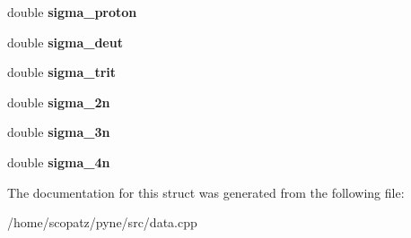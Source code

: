 \begin{DoxyCompactItemize}
\item 
\hypertarget{structsimple__xs_aff5767a5644512bc20acdb7b6be11f6a}{double {\bfseries sigma\-\_\-proton}}\label{structsimple__xs_aff5767a5644512bc20acdb7b6be11f6a}

\item 
\hypertarget{structsimple__xs_a144a201fa75999fe72b1e7ff6cf599de}{double {\bfseries sigma\-\_\-deut}}\label{structsimple__xs_a144a201fa75999fe72b1e7ff6cf599de}

\item 
\hypertarget{structsimple__xs_ac94cd1b3c4d07c830484563268c9e3b4}{double {\bfseries sigma\-\_\-trit}}\label{structsimple__xs_ac94cd1b3c4d07c830484563268c9e3b4}

\item 
\hypertarget{structsimple__xs_a48428459c08bd8e7ca73ede3d5d1b12d}{double {\bfseries sigma\-\_\-2n}}\label{structsimple__xs_a48428459c08bd8e7ca73ede3d5d1b12d}

\item 
\hypertarget{structsimple__xs_a2d20b02fe8098c55466d12de065bfdee}{double {\bfseries sigma\-\_\-3n}}\label{structsimple__xs_a2d20b02fe8098c55466d12de065bfdee}

\item 
\hypertarget{structsimple__xs_a1c2a32a82a8f3e381d67b778c89c499e}{double {\bfseries sigma\-\_\-4n}}\label{structsimple__xs_a1c2a32a82a8f3e381d67b778c89c499e}

\end{DoxyCompactItemize}


The documentation for this struct was generated from the following file\-:\begin{DoxyCompactItemize}
\item 
/home/scopatz/pyne/src/data.\-cpp\end{DoxyCompactItemize}
